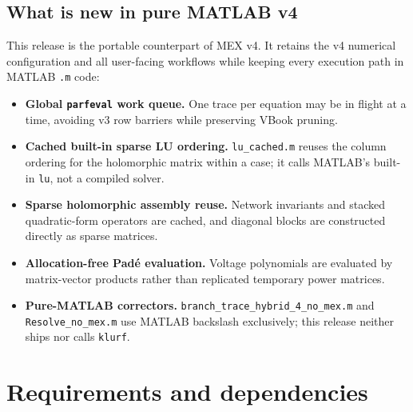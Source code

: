\documentclass[11pt,a4paper]{article}
\newcommand{\code}[1]{\texttt{#1}}
\begin{document}
\subsection{What is new in pure MATLAB v4}\label{sec:v4}
This release is the portable counterpart of MEX v4. It retains the v4 numerical
configuration and all user-facing workflows while keeping every execution path in
MATLAB \code{.m} code:
\begin{itemize}[leftmargin=1.4em]
  \item \textbf{Global \code{parfeval} work queue.} One trace per equation may be in
        flight at a time, avoiding v3 row barriers while preserving VBook pruning.
  \item \textbf{Cached built-in sparse LU ordering.} \code{lu_cached.m} reuses the
        column ordering for the holomorphic matrix within a case; it calls MATLAB's
        built-in \code{lu}, not a compiled solver.
  \item \textbf{Sparse holomorphic assembly reuse.} Network invariants and stacked
        quadratic-form operators are cached, and diagonal blocks are constructed directly
        as sparse matrices.
  \item \textbf{Allocation-free Pad\'e evaluation.} Voltage polynomials are evaluated
        by matrix-vector products rather than replicated temporary power matrices.
  \item \textbf{Pure-MATLAB correctors.} \code{branch_trace_hybrid_4_no_mex.m} and
        \code{Resolve_no_mex.m} use MATLAB backslash exclusively; this release neither
        ships nor calls \code{klurf}.
\end{itemize}

\section{Requirements and dependencies}
\end{document}
